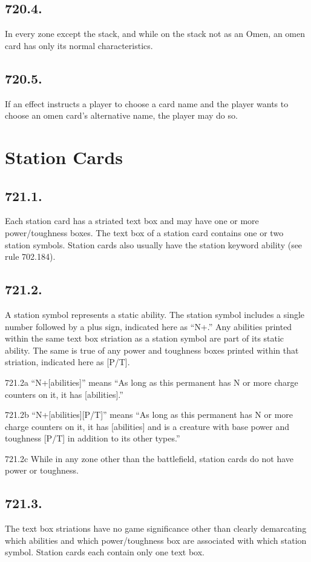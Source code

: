 \subsection*{720.4.}
In every zone except the stack, and while on the stack not as an Omen, an omen card has only its normal characteristics.

\subsection*{720.5.}
If an effect instructs a player to choose a card name and the player wants to choose an omen card’s alternative name, the player may do so.

\section{Station Cards}
\subsection*{721.1.}
Each station card has a striated text box and may have one or more power/toughness boxes. The text box of a station card contains one or two station symbols. Station cards also usually have the station keyword ability (see rule 702.184).

\subsection*{721.2.}
A station symbol represents a static ability. The station symbol includes a single number followed by a plus sign, indicated here as “{N+}.” Any abilities printed within the same text box striation as a station symbol are part of its static ability. The same is true of any power and toughness boxes printed within that striation, indicated here as [P/T].

721.2a “{N+}[abilities]” means “As long as this permanent has N or more charge counters on it, it has [abilities].”

721.2b “{N+}[abilities][P/T]” means “As long as this permanent has N or more charge counters on it, it has [abilities] and is a creature with base power and toughness [P/T] in addition to its other types.”

721.2c While in any zone other than the battlefield, station cards do not have power or toughness.

\subsection*{721.3.}
The text box striations have no game significance other than clearly demarcating which abilities and which power/toughness box are associated with which station symbol. Station cards each contain only one text box.

